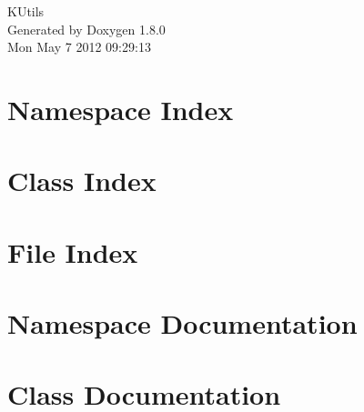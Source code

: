 \documentclass{book}
\begin{document}
\hypersetup{pageanchor=false,citecolor=blue}
\begin{titlepage}
\vspace*{7cm}
\begin{center}
{\Large K\-Utils }\\
\vspace*{1cm}
{\large Generated by Doxygen 1.8.0}\\
\vspace*{0.5cm}
{\small Mon May 7 2012 09:29:13}\\
\end{center}
\end{titlepage}
\clearemptydoublepage
{}
\tableofcontents
\clearemptydoublepage
{}
\hypersetup{pageanchor=true,citecolor=blue}
\chapter{Namespace Index}

\chapter{Class Index}

\chapter{File Index}

\chapter{Namespace Documentation}























\chapter{Class Documentation}

















\end{document}
